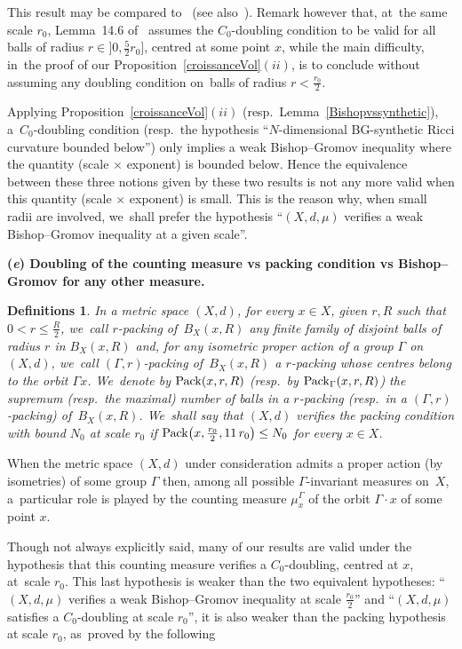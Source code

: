 \documentclass[pdftex]{sigma}
\numberwithin{equation}{section}
\newtheorem{defis}[theor]{Definitions}
\begin{document}
This result may be compared to~\cite[Lemma~14.6]{HK} (see also~\cite[inequality (21)]{HK}). Remark however that, at~the same scale $r_0$,
Lemma~14.6 of~\cite{HK} assumes the $C_0$-doubling condition to be valid for all balls of radius $r \in \big]0,\frac{5}{2} r_0\big]$, centred at some point $x$, while the main difficulty, in~the proof of our Proposition~\ref{croissanceVol}$(ii)$, is to conclude without assuming any doubling condition on~balls
of radius $r < \frac{r_0}{2}$.

Applying Proposition~\ref{croissanceVol}$(ii)$ (resp.\ Lemma~\ref{Bishopvssynthetic}), a~$C_0$-doubling condition (resp.\ the hypo\-thesis ``$N$-dimensional
BG-synthetic Ricci curvature bounded below'') only implies a weak Bishop--Gromov inequality where the quantity (scale$\,\times \,$exponent) is bounded below.
Hence the equivalence between these three notions given by these two results is not any more valid when this quantity (scale$\,\times \,$exponent)
is small. This is the reason why, when small radii are involved, we~shall
prefer the hypothesis
``$(X,d, \mu)$ verifies a weak Bishop--Gromov inequality at a given
scale''.

\medskip\noindent
{\bf (\emph{e}) Doubling of the counting measure vs packing condition vs Bishop--Gromov for any other measure.}
\begin{defis}\label{packings}
In a metric space $(X,d)$, for every $x \in X$, given $r, R$ such that $0 < r \le \frac{R}{2}$, we~call $r$-packing of~$B_X (x, R)$ any finite family
of disjoint balls of radius $r$ in $B_X (x, R)$ and, for any isometric proper action of a group $\Gamma$
on $(X,d)$, we~call $(\Gamma,r)$-packing of~$B_X (x, R)$ a $r$-packing whose centres belong to the orbit $\Gamma x$. We~denote by ${\rm Pack} (x, r, R)$ (resp.\ by ${\rm Pack}_\Gamma (x, r, R)$) the supremum (resp.\ the maximal) number of balls in a $ r$-packing (resp.\ in a
$(\Gamma,r)$-packing) of~$B_X (x, R)$. We~shall say that $(X,d)$ verifies the packing condition with bound $N_0$
at scale $r_0$ if ${\rm Pack} \big(x, \frac{r_0}{2}, 11\, r_0\big) \le N_0$ for every $x \in X$.
\end{defis}

When the metric space $(X,d)$ under consideration admits a proper action (by isometries) of some group $\Gamma$ then, among all possible $\Gamma$-invariant measures on~$X$, a~particular role is played by the counting measure $\mu_x^\Gamma$ of the orbit $\Gamma \cdot x$ of some point $x$.

Though not always explicitly said, many of our results are valid under the hypothesis that this counting measure verifies a $ C_0 $-doubling,
centred at $ x $, at~scale $ r_0 $. This last hypothesis is weaker
than the two equivalent hypotheses: ``$(X,d, \mu)$ verifies a weak
Bishop--Gromov inequality at scale $\frac{r_0}{2}$'' and
``$(X,d, \mu)$ satisfies a $C_0$-doubling at scale $r_0$'', it is also weaker than the packing hypothesis at scale $r_0$, as~proved by the following
\end{document}
